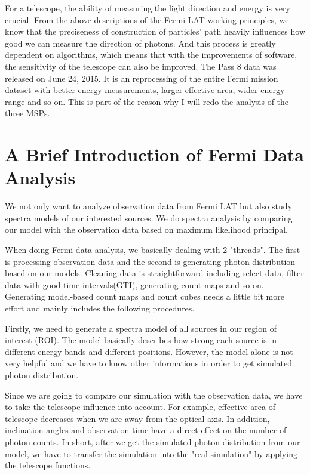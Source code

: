 \documentclass[12pt]{report}
\begin{document}
        For a telescope, the ability of measuring the light direction and energy is very crucial. 
        From the above descriptions of the Fermi LAT working principles, we know that the preciseness of 
        construction of particles' path heavily influences how good we can measure the direction of photons. 
        And this process is greatly dependent on algorithms, which means that with the improvements of software,
        the sensitivity of the telescope can also be improved. The Pass 8 data was released on June 24, 2015.
        It is an reprocessing of the entire Fermi mission dataset with better energy measurements, larger effective 
        area, wider energy range and so on. This is part of the reason why I will redo the analysis of the three MSPs.

        \section{A Brief Introduction of Fermi Data Analysis}
          We not only want to analyze observation data from Fermi LAT but also study spectra 
          models of our interested sources. We do spectra analysis by comparing our model with 
          the observation data based on maximum likelihood principal. 

          When doing Fermi data analysis, we basically dealing with 2 "threads". The first is 
          processing observation data and the second is generating photon distribution based on 
          our models. Cleaning data is straightforward including select data, filter data with 
          good time intervals(GTI), generating count maps and so on. Generating model-based count 
          maps and count cubes needs a little bit more effort and mainly includes the following 
          procedures. 

          Firstly, we need to generate a spectra model of all sources in our region of interest (ROI).
          The model basically describes how strong each source is in different energy bands and 
          different positions. However, the model alone is not very helpful and we have to know other 
          informations in order to get simulated photon distribution. 

          Since we are going to compare our simulation with the observation data, we have to 
          take the telescope influence into account. For example, 
          effective area of telescope decreases when we are away from the optical axis. 
          In addition, inclination angles and observation time have a direct effect on the 
          number of photon counts. In short, after we get the simulated photon distribution from 
          our model, we have to transfer the simulation into the "real simulation" by applying 
          the telescope functions. 
          
\end{document}
